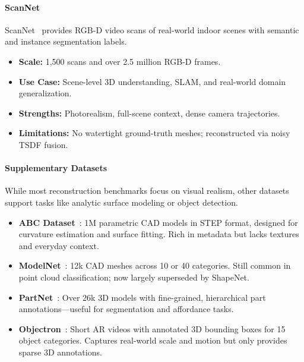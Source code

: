 \paragraph{ScanNet}
ScanNet~\cite{dai2017_scannet} provides RGB-D video scans of real-world indoor scenes with semantic and instance segmentation labels.

\begin{itemize}
    \item \textbf{Scale:} 1,500 scans and over 2.5 million RGB-D frames.
    \item \textbf{Use Case:} Scene-level 3D understanding, SLAM, and real-world domain generalization.
    \item \textbf{Strengths:} Photorealism, full-scene context, dense camera trajectories.
    \item \textbf{Limitations:} No watertight ground-truth meshes; reconstructed via noisy TSDF fusion.
\end{itemize}

\paragraph{Supplementary Datasets}
While most reconstruction benchmarks focus on visual realism, other datasets support tasks like analytic surface modeling or object detection.

\begin{itemize}
    \item \textbf{ABC Dataset}~\cite{koch2019_abc}: 1M parametric CAD models in STEP format, designed for curvature estimation and surface fitting. Rich in metadata but lacks textures and everyday context.
    
    \item \textbf{ModelNet}~\cite{wu2015_shapenets}: 12k CAD meshes across 10 or 40 categories. Still common in point cloud classification; now largely superseded by ShapeNet.
    
    \item \textbf{PartNet}~\cite{mo2019_partnet}: Over 26k 3D models with fine-grained, hierarchical part annotations—useful for segmentation and affordance tasks.
    
    \item \textbf{Objectron}~\cite{ahmadyan2021_objectron}: Short AR videos with annotated 3D bounding boxes for 15 object categories. Captures real-world scale and motion but only provides sparse 3D annotations.
\end{itemize}

